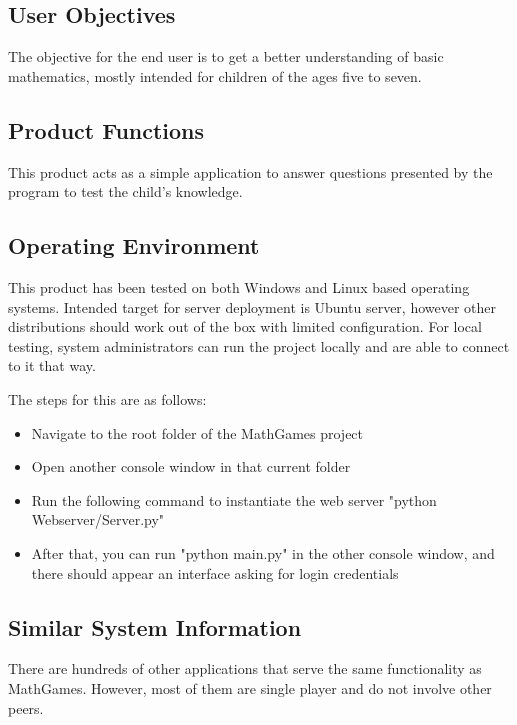 \documentclass[12pt]{article}
\begin{document}
\subsection{User Objectives}

The objective for the end user is to get a better understanding of basic mathematics, mostly intended for children of the ages five to seven.

\subsection{Product Functions}

This product acts as a simple application to answer questions presented by the program to test the child's knowledge.

\subsection{Operating Environment}

\label{marker}

This product has been tested on both Windows and Linux based operating systems.
Intended target for server deployment is Ubuntu server, however other distributions should work out of the box with limited configuration.
For local testing, system administrators can run the project locally and are able to connect to it that way.

The steps for this are as follows:

\begin{itemize}
\item Navigate to the root folder of the MathGames project
\item Open another console window in that current folder
\item Run the following command to instantiate the web server "python Webserver/Server.py"
\item After that, you can run "python main.py" in the other console window, and there should appear an interface asking for login credentials
\end{itemize}

\subsection{Similar System Information}

There are hundreds of other applications that serve the same functionality as MathGames.
However, most of them are single player and do not involve other peers.
\end{document}
